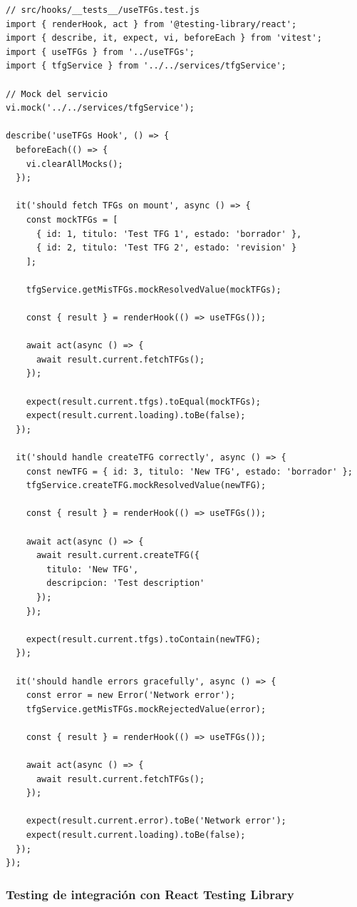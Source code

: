 \documentclass[12pt,a4paper,oneside]{report}
\begin{document}
\begin{lstlisting}
// src/hooks/__tests__/useTFGs.test.js
import { renderHook, act } from '@testing-library/react';
import { describe, it, expect, vi, beforeEach } from 'vitest';
import { useTFGs } from '../useTFGs';
import { tfgService } from '../../services/tfgService';

// Mock del servicio
vi.mock('../../services/tfgService');

describe('useTFGs Hook', () => {
  beforeEach(() => {
    vi.clearAllMocks();
  });

  it('should fetch TFGs on mount', async () => {
    const mockTFGs = [
      { id: 1, titulo: 'Test TFG 1', estado: 'borrador' },
      { id: 2, titulo: 'Test TFG 2', estado: 'revision' }
    ];

    tfgService.getMisTFGs.mockResolvedValue(mockTFGs);

    const { result } = renderHook(() => useTFGs());

    await act(async () => {
      await result.current.fetchTFGs();
    });

    expect(result.current.tfgs).toEqual(mockTFGs);
    expect(result.current.loading).toBe(false);
  });

  it('should handle createTFG correctly', async () => {
    const newTFG = { id: 3, titulo: 'New TFG', estado: 'borrador' };
    tfgService.createTFG.mockResolvedValue(newTFG);

    const { result } = renderHook(() => useTFGs());

    await act(async () => {
      await result.current.createTFG({
        titulo: 'New TFG',
        descripcion: 'Test description'
      });
    });

    expect(result.current.tfgs).toContain(newTFG);
  });

  it('should handle errors gracefully', async () => {
    const error = new Error('Network error');
    tfgService.getMisTFGs.mockRejectedValue(error);

    const { result } = renderHook(() => useTFGs());

    await act(async () => {
      await result.current.fetchTFGs();
    });

    expect(result.current.error).toBe('Network error');
    expect(result.current.loading).toBe(false);
  });
});
\end{lstlisting}

\subsubsection{Testing de integración con React Testing
Library}\label{testing-de-integraciuxf3n-con-react-testing-library}
\end{document}
